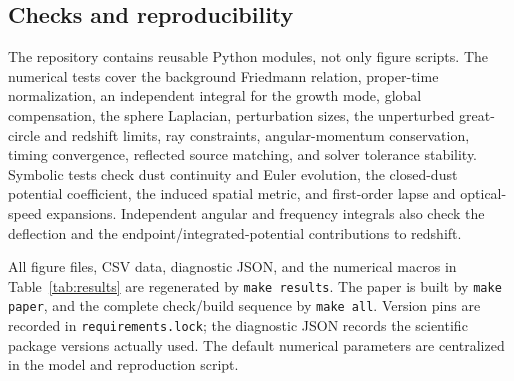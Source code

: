 \subsection{Checks and reproducibility}
The repository contains reusable Python modules, not only figure scripts.
The numerical tests cover the background Friedmann relation, proper-time
normalization, an independent integral for the growth mode, global
compensation, the sphere Laplacian, perturbation sizes, the unperturbed
great-circle and redshift limits, ray constraints, angular-momentum
conservation, timing convergence, reflected source matching, and solver
tolerance stability. Symbolic tests check dust continuity and Euler
evolution, the closed-dust potential coefficient, the induced spatial
metric, and first-order lapse and optical-speed expansions.
Independent angular and frequency integrals also check the deflection
and the endpoint/integrated-potential contributions to redshift.

All figure files, CSV data, diagnostic JSON, and the numerical macros in
Table~\ref{tab:results} are regenerated by \texttt{make results}.
The paper is built by \texttt{make paper}, and the complete check/build
sequence by \texttt{make all}. Version pins are recorded in
\texttt{requirements.lock}; the diagnostic JSON records the scientific
package versions actually used. The default numerical parameters are
centralized in the model and reproduction script.
\FloatBarrier
